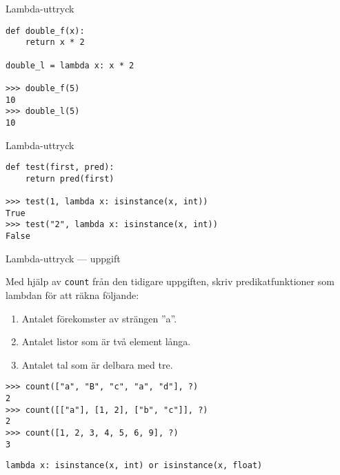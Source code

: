 \documentclass{beamer}
\begin{document}
  \begin{frame}[fragile]{Lambda-uttryck}

    \begin{lstlisting}
def double_f(x):
    return x * 2

double_l = lambda x: x * 2

>>> double_f(5)
10
>>> double_l(5)
10
    \end{lstlisting}

  \end{frame}

  \begin{frame}[fragile]{Lambda-uttryck}

    \begin{lstlisting}
def test(first, pred):
    return pred(first)

>>> test(1, lambda x: isinstance(x, int))
True
>>> test("2", lambda x: isinstance(x, int))
False
    \end{lstlisting}

  \end{frame}

  \begin{frame}[fragile]{Lambda-uttryck --- uppgift}

    Med hjälp av \texttt{count} från den tidigare uppgiften, skriv
    predikatfunktioner som lambdan för att räkna följande:

    \begin{enumerate}
      \item Antalet förekomster av strängen ''a''.
      \item Antalet listor som är två element långa.
      \item Antalet tal som är delbara med tre.
    \end{enumerate}

    \begin{lstlisting}
>>> count(["a", "B", "c", "a", "d"], ?)
2
>>> count([["a"], [1, 2], ["b", "c"]], ?)
2
>>> count([1, 2, 3, 4, 5, 6, 9], ?)
3
    \end{lstlisting}

    \begin{lstlisting}
lambda x: isinstance(x, int) or isinstance(x, float)
    \end{lstlisting}

  \end{frame}
\end{document}
